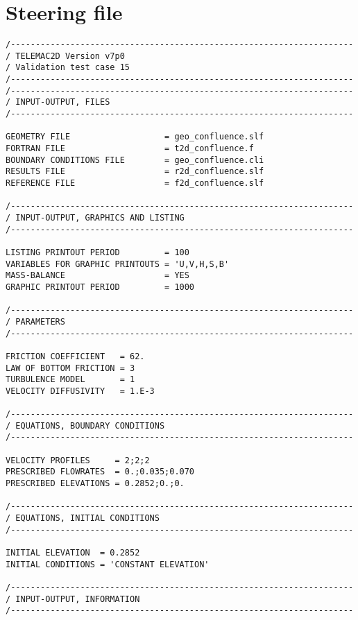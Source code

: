 \section{Steering file}
\begin{lstlisting}[language=TelemacCas]
/---------------------------------------------------------------------
/ TELEMAC2D Version v7p0
/ Validation test case 15
/---------------------------------------------------------------------
/---------------------------------------------------------------------
/ INPUT-OUTPUT, FILES
/---------------------------------------------------------------------

GEOMETRY FILE                   = geo_confluence.slf
FORTRAN FILE                    = t2d_confluence.f
BOUNDARY CONDITIONS FILE        = geo_confluence.cli
RESULTS FILE                    = r2d_confluence.slf
REFERENCE FILE                  = f2d_confluence.slf

/---------------------------------------------------------------------
/ INPUT-OUTPUT, GRAPHICS AND LISTING
/---------------------------------------------------------------------

LISTING PRINTOUT PERIOD         = 100
VARIABLES FOR GRAPHIC PRINTOUTS = 'U,V,H,S,B'
MASS-BALANCE                    = YES
GRAPHIC PRINTOUT PERIOD         = 1000

/---------------------------------------------------------------------
/ PARAMETERS
/---------------------------------------------------------------------

FRICTION COEFFICIENT   = 62.
LAW OF BOTTOM FRICTION = 3
TURBULENCE MODEL       = 1
VELOCITY DIFFUSIVITY   = 1.E-3

/---------------------------------------------------------------------
/ EQUATIONS, BOUNDARY CONDITIONS
/---------------------------------------------------------------------

VELOCITY PROFILES     = 2;2;2
PRESCRIBED FLOWRATES  = 0.;0.035;0.070
PRESCRIBED ELEVATIONS = 0.2852;0.;0.

/---------------------------------------------------------------------
/ EQUATIONS, INITIAL CONDITIONS
/---------------------------------------------------------------------

INITIAL ELEVATION  = 0.2852
INITIAL CONDITIONS = 'CONSTANT ELEVATION'

/---------------------------------------------------------------------
/ INPUT-OUTPUT, INFORMATION
/---------------------------------------------------------------------


\end{lstlisting}
